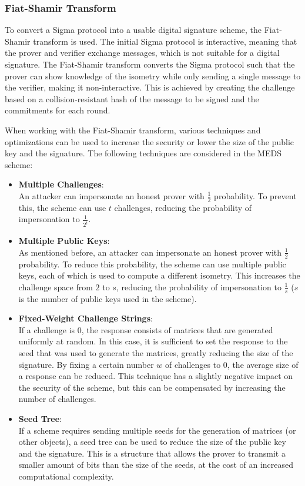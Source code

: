 \documentclass[11pt,a4paper]{report}
\theoremstyle{definition}
\begin{document}
\subsubsection{Fiat-Shamir Transform}
\label{sec:fiatshamir}
To convert a Sigma protocol into a usable digital signature scheme, the Fiat-Shamir transform \cite{fiat1986prove} is used. The initial Sigma protocol is interactive, meaning that the prover and verifier exchange messages, which is not suitable for a digital signature. The Fiat-Shamir transform converts the Sigma protocol such that the prover can show knowledge of the isometry while only sending a single message to the verifier, making it non-interactive. This is achieved by creating the challenge based on a collision-resistant hash of the message to be signed and the commitments for each round.

When working with the Fiat-Shamir transform, various techniques and optimizations can be used to increase the security or lower the size of the public key and the signature. The following techniques are considered in the MEDS scheme:
\begin{itemize}
  \item \textbf{Multiple Challenges}:\\
  An attacker can impersonate an honest prover with $\frac{1}{2}$ probability. To prevent this, the scheme can use $t$ challenges, reducing the probability of impersonation to $\frac{1}{2^t}$.
  \item \textbf{Multiple Public Keys}:\\
  As mentioned before, an attacker can impersonate an honest prover with $\frac{1}{2}$ probability. To reduce this probability, the scheme can use multiple public keys, each of which is used to compute a different isometry. This increases the challenge space from $2$ to $s$, reducing the probability of impersonation to $\frac{1}{s}$ ($s$ is the number of public keys used in the scheme).
  \item \textbf{Fixed-Weight Challenge Strings}:\\
  If a challenge is 0, the response consists of matrices that are generated uniformly at random. In this case, it is sufficient to set the response to the seed that was used to generate the matrices, greatly reducing the size of the signature. By fixing a certain number $w$ of challenges to 0, the average size of a response can be reduced. This technique has a slightly negative impact on the security of the scheme, but this can be compensated by increasing the number of challenges.
  \item \textbf{Seed Tree}:\\
  If a scheme requires sending multiple seeds for the generation of matrices (or other objects), a seed tree can be used to reduce the size of the public key and the signature. This is a structure that allows the prover to transmit a smaller amount of bits than the size of the seeds, at the cost of an increased computational complexity.
\end{itemize}
\end{document}
